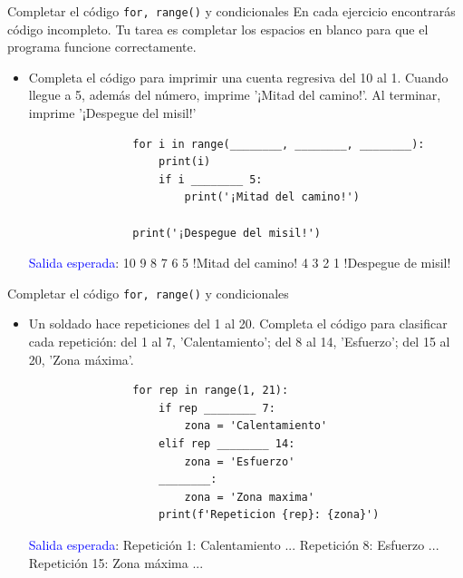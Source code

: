 \documentclass{beamer}
\begin{document}
    \begin{frame}[fragile, t]{Completar el código \texttt{for, range()} y condicionales}
        En cada ejercicio encontrarás código incompleto. Tu tarea es completar los espacios en blanco para que el programa funcione correctamente.
        \begin{itemize}
            \item Completa el código para imprimir una cuenta regresiva del 10 al 1. Cuando llegue a 5, además del número, imprime '¡Mitad del camino!'. Al terminar, imprime '¡Despegue del misil!'
            \begin{verbatim}
                for i in range(________, ________, ________):
                    print(i)
                    if i ________ 5:
                        print('¡Mitad del camino!')
                
                print('¡Despegue del misil!')
            \end{verbatim}
            \textcolor{blue}{Salida esperada}: 10 9 8 7 6 5 !Mitad del camino! 4 3 2 1 !Despegue de misil!
        \end{itemize}
    \end{frame}

    \begin{frame}[fragile, t]{Completar el código \texttt{for, range()} y condicionales}
        \begin{itemize}
            \item Un soldado hace repeticiones del 1 al 20. Completa el código para clasificar cada repetición: del 1 al 7, 'Calentamiento'; del 8 al 14, 'Esfuerzo'; del 15 al 20, 'Zona máxima'.
            \begin{verbatim}
                for rep in range(1, 21):
                    if rep ________ 7:
                        zona = 'Calentamiento'
                    elif rep ________ 14:
                        zona = 'Esfuerzo'
                    ________:
                        zona = 'Zona maxima'
                    print(f'Repeticion {rep}: {zona}')
            \end{verbatim}
            \textcolor{blue}{Salida esperada}: Repetición 1: Calentamiento  ...  Repetición 8: Esfuerzo  ...  Repetición 15: Zona máxima  ...
        \end{itemize}
    \end{frame}
\end{document}
